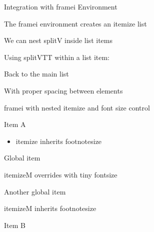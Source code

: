 \documentclass[11pt,compress,t,notes=noshow, xcolor=table]{beamer}
\begin{document}

\begin{framei}[fs=footnotesize,sep=M]{Integration with framei Environment}
  \item The framei environment creates an itemize list
  \item We can nest splitV inside list items
  
  \item Using splitVTT within a list item:
  
  \item Back to the main list
  \item With proper spacing between elements
\end{framei}


\begin{framei}[fs=footnotesize]{framei with nested itemize and font size control}
  \item Item A
  \begin{itemize}
    \item itemize inherits footnotesize
  \end{itemize}
  \item Global item
  \begin{itemizeM}[tiny]
    \item itemizeM overrides with tiny fontsize
  \end{itemizeM}
  \item Another global item
  \begin{itemizeM}
    \item itemizeM inherits footnotesize
  \end{itemizeM}
  \item Item B
\end{framei}

\end{document}
